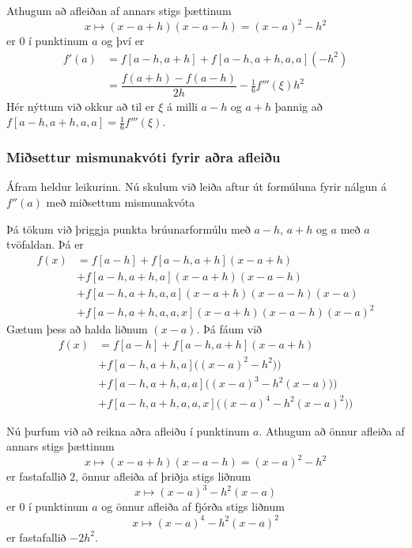 \documentclass[icelandic,a4paper,12pt]{article}
\begin{document}
\pause
\smallskip
Athugum að afleiðan af annars stigs þættinum
$$
  x\mapsto (x-a+h)(x-a-h)=(x-a)^2-h^2
$$
er $0$ í punktinum $a$ og því er
\begin{align*}
  f'(a)&=f[a-h,a+h]+f[a-h,a+h,a,a](-h^2)\\
  &=\dfrac{f(a+h)-f(a-h)}{2h}-\tfrac 16 f'''(\xi)h^2 
\end{align*}
Hér nýttum við okkur að til er $\xi$ á milli 
$a-h$ og $a+h$ þannig að $f[a-h,a+h,a,a]=\tfrac 16 f'''(\xi)$.



\subsubsection{Miðsettur mismunakvóti fyrir aðra afleiðu} 
Áfram heldur leikurinn.  
Nú skulum við leiða aftur út formúluna fyrir nálgun á $f''(a)$ með
miðsettum mismunakvóta 

\pause
\smallskip
Þá tökum við þriggja punkta brúunarformúlu með $a-h$, $a+h$ og
$a$ með $a$ tvöfaldan.  Þá er
\begin{align*}
  f(x)&=f[a-h]+f[a-h,a+h](x-a+h)\\
  &+f[a-h,a+h,a](x-a+h)(x-a-h)\\
  &+f[a-h,a+h,a,a](x-a+h)(x-a-h)(x-a)\\
  &+f[a-h,a+h,a,a,x](x-a+h)(x-a-h)(x-a)^2
\end{align*}
Gætum þess að halda liðnum $(x-a)$.  Þá fáum við
\begin{align*}
  f(x)&=f[a-h]+f[a-h,a+h](x-a+h)\\
  &+f[a-h,a+h,a]\big((x-a)^2-h^2)\big)\\
  &+f[a-h,a+h,a,a]\big((x-a)^3-h^2(x-a))\big)\\
  &+f[a-h,a+h,a,a,x]\big((x-a)^4-h^2(x-a)^2)\big)
\end{align*}



Nú þurfum við að reikna aðra afleiðu í punktinum $a$. 
Athugum að önnur afleiða af annars stigs þættinum
$$
  x\mapsto (x-a+h)(x-a-h)=(x-a)^2-h^2
$$
er fastafallið $2$, önnur afleiða af þriðja stigs liðnum
$$
  x\mapsto (x-a)^3-h^2(x-a)
$$
er $0$ í punktinum $a$ og önnur afleiða af fjórða stigs liðnum
$$
  x\mapsto (x-a)^4-h^2(x-a)^2
$$
er fastafallið $-2h^2$.  
\end{document}
